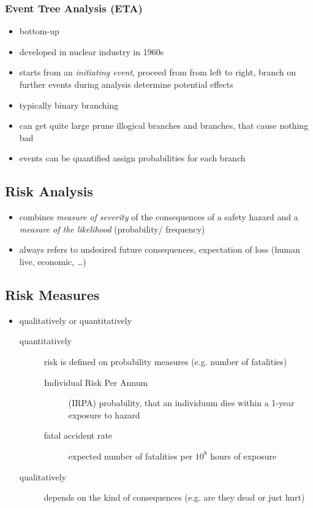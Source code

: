 \documentclass[a4paper, 10pt]{article}
\begin{document}
\subsubsection*{Event Tree Analysis (ETA)}
\begin{itemize}
    \item bottom-up
    \item developed in nuclear industry in 1960s
    \item starts from an \emph{initiating event}, proceed from from left to right, branch on further events during analysis \follows determine potential effects
    \item typically binary branching
    \item can get quite large \follows prune illogical branches and branches, that cause nothing bad
    \item events can be quantified \follows assign probabilities for each branch
\end{itemize}

\subsection*{Risk Analysis}
\begin{itemize}
    \item combines \emph{measure of severity} of the consequences of a safety hazard and a \emph{measure of the likelihood} (probability/ frequency)
    \item always refers to undesired future consequences, expectation of loss (human live, economic, \dots)
\end{itemize}

\subsection*{Risk Measures}
\begin{itemize}
    \item qualitatively or quantitatively
    \begin{description}
        \item[quantitatively] risk is defined on probability measures (e.g. number of fatalities)
        \begin{description}
            \item[Individual Risk Per Annum] (IRPA) probability, that an individuum dies within a 1-year exposure to hazard
            \item[fatal accident rate] expected number of fatalities per $10^8$ hours of exposure
        \end{description}
        \item[qualitatively] depends on the kind of consequences (e.g. are they dead or just hurt)
    \end{description}
\end{itemize}
\end{document}
